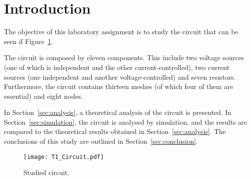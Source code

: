 \section{Introduction}
\label{sec:introduction}

The objective of this laboratory assignment is to study the circuit that can be seen if Figure~\ref{fig:T1_Circuit}.
 
The circuit is composed by eleven components. This include two voltage sources (one of which is independent and the other current-controlled), two current sources (one independent and another voltage-controlled) and seven resistors. Furthermore, the circuit contains thirteen meshes (of which four of them are essential) and eight nodes.

In Section~\ref{sec:analysis}, a theoretical analysis of the circuit is
presented. In Section~\ref{sec:simulation}, the circuit is analysed by
simulation, and the results are compared to the theoretical results obtained in Section~\ref{sec:analysis}. The conclusions of this study are outlined in
Section~\ref{sec:conclusion}.

\begin{figure}[h] \centering
\texttt{[image: T1\_Circuit.pdf]}
\caption{Studied circuit.}
\label{fig:T1_Circuit}
\end{figure}


